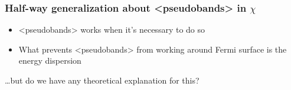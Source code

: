 \documentclass[t,aspectratio=169]{beamer}
\newcommand{\shortcode}[1]{\texttt{#1}}
\def\texttt#1{<#1>}%
\begin{document}
\begin{frame}
\begin{columns}
\begin{column}{0.5\textwidth}


\end{column}

\end{columns}

\end{frame}


\begin{frame}
\frametitle{Half-way generalization about \shortcode{pseudobands} in $\chi$}

\begin{itemize}
    \item[\faHandPointRight] \shortcode{pseudobands} works  
    when it's necessary to do so 
    \item[\faHandPointRight] What prevents \shortcode{pseudobands} from working 
    around Fermi surface is the energy dispersion
\end{itemize}

\vspace{0.5cm}

\dots but do we have any theoretical explanation for this?

\end{frame}
\end{document}

